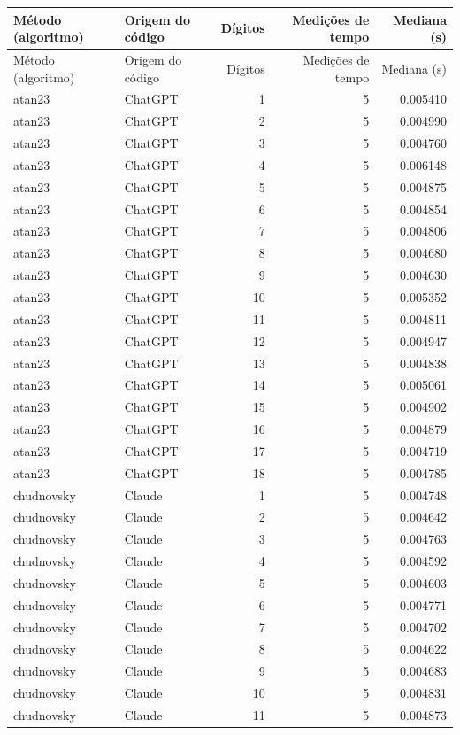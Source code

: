 \begin{longtable}{llrrr}
\toprule
Método (algoritmo) & Origem do código & Dígitos & Medições de tempo & Mediana (s)\\
\midrule
\endfirsthead
\toprule
Método (algoritmo) & Origem do código & Dígitos & Medições de tempo & Mediana (s)\\
\midrule
\endhead
atan23 & ChatGPT & 1 & 5 & 0.005410\\
atan23 & ChatGPT & 2 & 5 & 0.004990\\
atan23 & ChatGPT & 3 & 5 & 0.004760\\
atan23 & ChatGPT & 4 & 5 & 0.006148\\
atan23 & ChatGPT & 5 & 5 & 0.004875\\
atan23 & ChatGPT & 6 & 5 & 0.004854\\
atan23 & ChatGPT & 7 & 5 & 0.004806\\
atan23 & ChatGPT & 8 & 5 & 0.004680\\
atan23 & ChatGPT & 9 & 5 & 0.004630\\
atan23 & ChatGPT & 10 & 5 & 0.005352\\
atan23 & ChatGPT & 11 & 5 & 0.004811\\
atan23 & ChatGPT & 12 & 5 & 0.004947\\
atan23 & ChatGPT & 13 & 5 & 0.004838\\
atan23 & ChatGPT & 14 & 5 & 0.005061\\
atan23 & ChatGPT & 15 & 5 & 0.004902\\
atan23 & ChatGPT & 16 & 5 & 0.004879\\
atan23 & ChatGPT & 17 & 5 & 0.004719\\
atan23 & ChatGPT & 18 & 5 & 0.004785\\
chudnovsky & Claude & 1 & 5 & 0.004748\\
chudnovsky & Claude & 2 & 5 & 0.004642\\
chudnovsky & Claude & 3 & 5 & 0.004763\\
chudnovsky & Claude & 4 & 5 & 0.004592\\
chudnovsky & Claude & 5 & 5 & 0.004603\\
chudnovsky & Claude & 6 & 5 & 0.004771\\
chudnovsky & Claude & 7 & 5 & 0.004702\\
chudnovsky & Claude & 8 & 5 & 0.004622\\
chudnovsky & Claude & 9 & 5 & 0.004683\\
chudnovsky & Claude & 10 & 5 & 0.004831\\
chudnovsky & Claude & 11 & 5 & 0.004873\\

\end{longtable}
